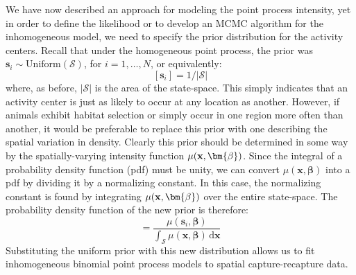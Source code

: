 We have now described an approach for modeling the point process
intensity, yet in order to define the likelihood or to develop an MCMC
algorithm for the inhomogeneous model, we need to specify the prior
distribution for the activity centers. Recall that under the
homogeneous point process, the prior was
$\mathbf{s}_i \sim \text{Uniform}(\mathcal{S})$, for $i=1,\dots,N$, or
equivalently:
\begin{equation}
  \label{state-space.eq.uprior}
  [\mathbf{s}_i] = 1/|\mathcal{S}|
\end{equation}
where, as before, $|\mathcal{S}|$ is the area of the
state-space. This simply indicates that an activity center is just as
likely to occur at any location as another.
However, if animals exhibit habitat selection or simply
occur in one region more often than another, it would be preferable to
replace this prior with one describing the spatial variation in
density. Clearly this prior should be determined in some way by the
spatially-varying intensity function $\mu({\bf x}, \bm{\beta})$.
Since
the integral of a probability density function (pdf) must be unity,
we can convert $\mu(\mathbf{x}, \bm{\beta})$ into a pdf by dividing it by a
normalizing constant. In this case, the normalizing constant is found by integrating
$\mu({\bf x}, \bm{\beta})$ over the entire state-space. %
The probability density function of the new prior is therefore:
\begin{equation}
[\mathbf{s}_i | \bm{\beta}] = \frac{\mu(\mathbf{s}_i, \bm{\beta})}{\int_{\mathcal{S}} \mu(\mathbf{x}, \bm{\beta})\, \mathrm{d}\mathbf{x}}
\label{state-space.eq.pdf.hetero}
\end{equation}
Substituting the uniform prior with this new distribution
allows us to fit inhomogeneous binomial point process
models to spatial capture-recapture data.

